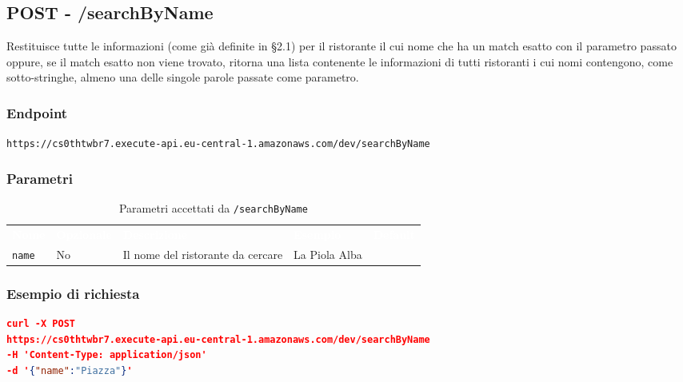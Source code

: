 \subsection{POST - /searchByName} 
Restituisce tutte le informazioni (come già definite in §2.1) per il ristorante il cui nome che ha un match esatto con il parametro passato oppure, se il match esatto non viene trovato, ritorna una lista contenente le informazioni di tutti ristoranti i cui nomi contengono, come sotto-stringhe, almeno una delle singole parole passate come parametro. 


\subsubsection{Endpoint}
\texttt{https://cs0thtwbr7.execute-api.eu-central-1.amazonaws.com/dev/searchByName}

\subsubsection{Parametri}
\begin{table}[!htbp]
\renewcommand{\arraystretch}{1.5}

\begin{tabular}[t]{ m{}<{\centering}  m{}<{\centering} m{}<{\centering} m{}<{\centering}  m{}<{\centering} }
	\rowcolor{darkblue}
	\textcolor{white}{\textbf{Nome}} &\textcolor{white}{\textbf{Opzionale}} &\textcolor{white}{\textbf{Descrizione}} &\textcolor{white}{\textbf{Esempio}} &\textcolor{white}{\textbf{Default}} \\ 
\texttt{name} & No & Il nome del ristorante da cercare & La Piola Alba &  \\

\end{tabular}
\caption{Parametri accettati da \texttt{/searchByName}}
\end{table}

\subsubsection{Esempio di richiesta}
\begin{lstlisting}[language=json, caption={Esempio di richiesta \texttt{/searchByName}}, captionpos=b]
curl -X POST 
https://cs0thtwbr7.execute-api.eu-central-1.amazonaws.com/dev/searchByName
-H 'Content-Type: application/json'
-d '{"name":"Piazza"}'

\end{lstlisting}

